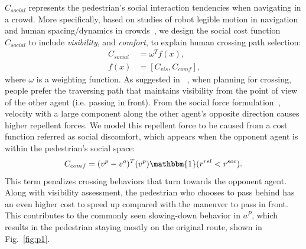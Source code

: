 \documentclass[conference]{IEEEtran}
\begin{document}
$C_{social}$ represents the pedestrian's social interaction tendencies when 
navigating in a crowd. More specifically, based on
studies of robot legible motion in 
navigation~\cite{kruse2012legible,lichtenthaler2012influence} and human 
spacing/dynamics in crowds~\cite{helbing1995social,hall1966hidden}, we design 
the social cost function $C_{social}$ to include \textit{visibility}, and \textit{comfort}, 
to explain human crossing path selection:
\begin{equation}~\label{eq:social_cost}
  \begin{aligned}
    C_{social} &= \omega^T f(x), \\
    f(x) &= [C_{vis}, C_{comf}],
  \end{aligned}
\end{equation}
where $\omega$ is a weighting function.
As suggested in ~\cite{kruse2012legible}, when planning for crossing, people 
prefer the traversing path that maintains visibility from the point of view of 
the other agent (i.e. passing in front).
From the social force formulation~\cite{helbing1995social}, velocity with a 
large component along the other agent's opposite direction 
causes higher repellent forces.
We model this repellent force to be caused from a cost function referred
as social discomfort, 
which appears when the opponent agent is within the pedestrian's social space:
\begin{equation}
  C_{comf} = (v^p-v^o)^T (v^p) \mathbbm{1}(r^{rel}<r^{soc}).
\end{equation}
This term penalizes crossing behaviors that turn towards the opponent agent. 
Along with visibility assessment, the pedestrian who chooses to pass 
behind has an even higher cost to speed up compared with the maneuver to pass 
in front. This contributes to the commonly seen slowing-down behavior in $a^P$, 
which results in the pedestrian staying mostly on the original route, 
shown in Fig.~\ref{fig:p1}.
\end{document}
